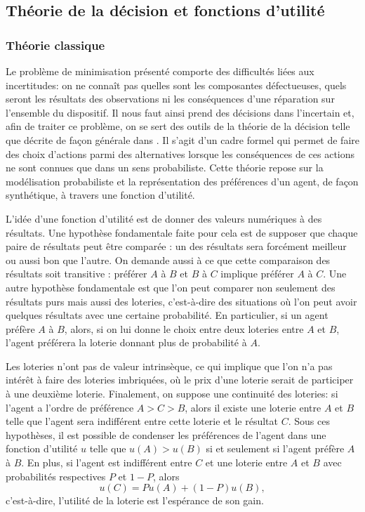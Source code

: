 \documentclass[a4paper,11pt]{article}
\theoremstyle{plain}
\begin{document}
\subsection{Théorie de la décision et fonctions d'utilité}

\subsubsection{Théorie classique}

Le problème de minimisation présenté comporte des difficultés liées aux incertitudes: on ne connaît pas quelles sont les composantes défectueuses, quels seront les résultats des observations ni les conséquences d'une réparation sur l'ensemble du dispositif. Il nous faut ainsi prend des décisions dans l'incertain et, afin de traiter ce problème, on se sert des outils de la théorie de la décision telle que décrite de façon générale dans \cite{North_1968}. Il s'agit d'un cadre formel qui permet de faire des choix d'actions parmi des alternatives lorsque les conséquences de ces actions ne sont connues que dans un sens probabiliste. Cette théorie repose sur la modélisation probabiliste et la représentation des préférences d'un agent, de façon synthétique, à travers une fonction d'utilité. 

L'idée d'une fonction d'utilité est de donner des valeurs numériques à des résultats. Une hypothèse fondamentale faite pour cela est de supposer que chaque paire de résultats peut être comparée : un des résultats sera forcément meilleur ou aussi bon que l'autre. On demande aussi à ce que cette comparaison des résultats soit transitive : préférer $A$ à $B$ et $B$ à $C$ implique préférer $A$ à $C$.
Une autre hypothèse fondamentale est que l'on peut comparer non seulement des résultats purs mais aussi des loteries, c'est-à-dire des situations où l'on peut avoir quelques résultats avec une certaine probabilité. En particulier, si un agent préfère $A$ à $B$, alors, si on lui donne le choix entre deux loteries entre $A$ et $B$, l'agent préférera la loterie donnant plus de probabilité à $A$. 

Les loteries n'ont pas de valeur intrinsèque, ce qui implique que l'on n'a pas intérêt à faire des loteries imbriquées, où le prix d'une loterie serait de participer à une deuxième loterie. Finalement, on suppose une continuité des loteries: si l'agent a l'ordre de préférence $A > C > B$, alors il existe une loterie entre $A$ et $B$ telle que l'agent sera indifférent entre cette loterie et le résultat $C$. Sous ces hypothèses, il est possible de condenser les préférences de l'agent dans une fonction d'utilité $u$ telle que $u(A) > u(B)$ si et seulement si l'agent préfère $A$ à $B$. En plus, si l'agent est indifférent entre $C$ et une loterie entre $A$ et $B$ avec probabilités respectives $P$ et $1-P$, alors \[u(C) = Pu(A) + (1-P)u(B),\] c'est-à-dire, l'utilité de la loterie est l'espérance de son gain.
\end{document}
